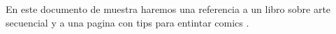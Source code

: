 \documentclass[12pt, spanish]{article}
\begin{document}
En este documento de muestra haremos una referencia a un libro sobre arte secuencial \cite{teoria_comics} y a una pagina con tips para entintar comics \cite{solo_lapiz}.



\end{document}
